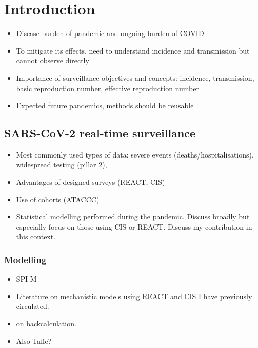 \documentclass[thesis.tex]{subfiles}
\begin{document}
\chapter{Introduction} \label{intro}

\begin{itemize}
    \item Disease burden of pandemic and ongoing burden of COVID
    \item To mitigate its effects, need to understand incidence and transmission but cannot observe directly
    \item Importance of surveillance objectives and concepts: incidence, transmission, basic reproduction number, effective reproduction number
    \item Expected future pandemics, methods should be reusable
\end{itemize}


\section{SARS-CoV-2 real-time surveillance}

\begin{itemize}
    \item Most commonly used types of data: severe events (deaths/hospitalisations), widespread testing (pillar 2), 
    \item Advantages of designed surveys (REACT, CIS)
    \item Use of cohorts (ATACCC)
    \item Statistical modelling performed during the pandemic. Discuss broadly but especially focus on those using CIS or REACT. Discuss my contribution in this context.
\end{itemize}

\subsection{Modelling}

\begin{itemize}
    \item SPI-M
    \item Literature on mechanistic models using REACT and CIS I have previously circulated.
    \item \textcite{mccabeCISincidence,abbottCISincidence} on backcalculation.
    \item Also Taffe?
\end{itemize}
\end{document}
